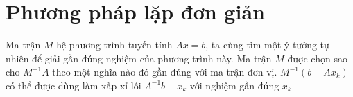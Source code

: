 \chapter{Phương pháp lặp đơn giản}
Ma trận $M$ hệ phương trình tuyến tính $Ax = b$, ta cùng tìm một ý tưởng tự nhiên để 
giải gần đúng nghiệm của phương trình này. Ma trận $M$ được chọn sao cho $M^{-1}A$
theo một nghĩa nào đó gần đúng với ma trận đơn vị. $M^{-1}(b - Ax_k)$ có thể được dùng
làm xấp xỉ lỗi $A^{-1}b - x_k$ với nghiệm gần đúng $x_k$